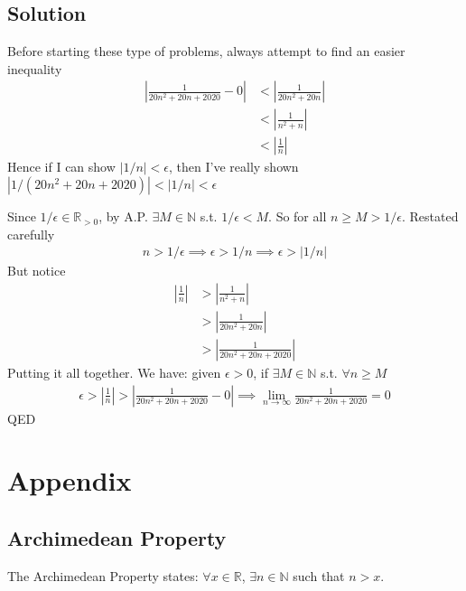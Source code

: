 \documentclass[12pt,fleqn]{article}
\numberwithin{equation}{section} %
\begin{document}
\subsection*{Solution}
\begin{sidework}
	Before starting these type of problems, always attempt to find an easier inequality
	\begin{align}
		\left | \frac{1}{20n^2 + 20n + 2020} - 0 \right| & < \left | \frac{1}{20n^2 + 20n} \right | \\
		& < \left | \frac{1}{n^2 + n} \right |\\
		& < \left | \frac{1}{n} \right |		
	\end{align}
	Hence if I can show $|1/n| < \epsilon$, then I've really shown $|1/(20n^2 + 20n + 2020)| < |1 / n| < \epsilon$
\end{sidework}
Since $1/\epsilon \in \mathbb R_{>0}$, by A.P. $\exists M \in \mathbb N$ s.t. $1/\epsilon < M$. So for all $n \geq M > 1/\epsilon$. Restated carefully 
\begin{align}
	n  > 1/\epsilon \implies \epsilon  > 1/n \implies \epsilon  > |1/n|
\end{align}
But notice
\begin{align}
	\left | \frac{1}{n} \right| & > \left | \frac{1}{n^2 + n} \right | \\
	& > \left | \frac{1}{20 n^2 + 20n} \right | \\
	& > \left | \frac{1}{20n^2 + 20n + 2020} \right | 
\end{align}
Putting it all together. We have: given $\epsilon > 0$, if $\exists M \in \mathbb N$ s.t. $\forall n \geq M$
\begin{align}
	\epsilon > \left | \frac{1}{n} \right| > \left | \frac{1}{20n^2 + 20n + 2020} - 0\right | \implies \lim_{n\to \infty} \frac{1}{20n^2 + 20n + 2020} = 0
\end{align}
QED














\newpage
\section*{Appendix}
\subsection*{Archimedean Property}
The Archimedean Property states: $\forall x \in \mathbb R$, $\exists n \in \mathbb N$ such that $n > x$.
\end{document}
